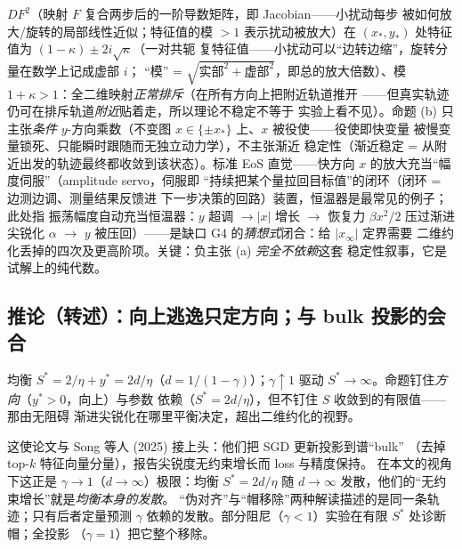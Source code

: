 \begin{remark}
$DF^2$（映射 $F$ 复合两步后的一阶导数矩阵，即 Jacobian——小扰动每步
被如何放大/旋转的局部线性近似；特征值的模 $>1$ 表示扰动被放大）在 $(x_*,y_*)$ 处特征值为 $(1-\kappa)\pm2i\sqrt{\kappa}$（一对共轭
复特征值——小扰动可以``边转边缩''，旋转分量在数学上记成虚部 $i$；
``模'' = $\sqrt{\text{实部}^2+\text{虚部}^2}$，即总的放大倍数）、模
$1+\kappa>1$：全二维映射\emph{正常排斥}（在所有方向上把附近轨道推开
——但真实轨迹仍可在排斥轨道\emph{附近}贴着走，所以理论不稳定不等于
实验上看不见）。命题 (b) 只主张\emph{条件}
$y$-方向乘数（不变图 $x\in\{\pm x_*\}$ 上、$x$ 被役使——役使即快变量
被慢变量锁死、只能瞬时跟随而无独立动力学），不主张渐近
稳定性（渐近稳定 = 从附近出发的轨迹最终都收敛到该状态）。标准 EoS 直觉——快方向 $x$ 的放大充当“幅度伺服”（amplitude servo，伺服即
“持续把某个量拉回目标值”的闭环（闭环 = 边测边调、测量结果反馈进
下一步决策的回路）装置，恒温器是最常见的例子；此处指
振荡幅度自动充当恒温器：$y$ 超调
$\to|x|$ 增长 $\to$ 恢复力 $\beta x^2/2$ 压过渐进尖锐化 $\alpha$ $\to$
$y$ 被压回）——是缺口 G4 的\emph{猜想式}闭合：给 $|x_\infty|$ 定界需要
二维约化丢掉的四次及更高阶项。关键：负主张 (a) \emph{完全不依赖}这套
稳定性叙事，它是试解上的纯代数。
\end{remark}

\subsection{推论（转述）：向上逃逸只定方向；与 bulk 投影的会合}\label{sec:ch09-upward}

\begin{corollary}
均衡 $S^{*}=2/\eta+y^{*}=2d/\eta$（$d=1/(1-\gamma)$）；$\gamma\uparrow1$
驱动 $S^{*}\to\infty$。命题钉住\emph{方向}（$y^{*}>0$，向上）与参数
依赖（$S^{*}=2d/\eta$），但不钉住 $S$ 收敛到的有限值——那由无阻碍
渐进尖锐化在哪里平衡决定，超出二维约化的视野。
\end{corollary}

这使论文与 Song 等人 (2025) 接上头：他们把 SGD 更新投影到谱“bulk”
（去掉 top-$k$ 特征向量分量），报告尖锐度无约束增长而 loss 与精度保持。
在本文的视角下这正是 $\gamma\to1$（$d\to\infty$）极限：均衡 $S^{*}=2d/\eta$
随 $d\to\infty$ 发散，他们的“无约束增长”就是\emph{均衡本身的发散}。
“伪对齐”与“帽移除”两种解读描述的是同一条轨迹；只有后者定量预测 $\gamma$
依赖的发散。部分阻尼（$\gamma<1$）实验在有限 $S^{*}$ 处诊断帽；全投影
（$\gamma=1$）把它整个移除。

